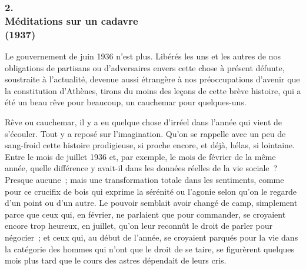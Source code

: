 \documentclass[french,twoside]{book} %
\begin{document}
\subsubsection[2. Méditations sur un cadavre, (1937)]{2. \\
Méditations sur un cadavre \\
(1937)}
\noindent \par
Le gouvernement de juin 1936 n'est plus. Libérés les uns et les autres de nos obligations de partisans ou d'adversaires envers cette chose à présent défunte, soustraite à l'actualité, devenue aussi étrangère à nos préoccupations d'avenir que la constitution d'Athènes, tirons du moins des leçons de cette brève histoire, qui a été un beau rêve pour beaucoup, un cauchemar pour quelques-uns.\par
Rêve ou cauchemar, il y a eu quelque chose d'irréel dans l'année qui vient de s'écouler. Tout y a reposé sur l'imagination. Qu'on se rappelle avec un peu de sang-froid cette histoire prodigieuse, si proche encore, et déjà, hélas, si lointaine. Entre le mois de juillet 1936 et, par exemple, le mois de février de la même année, quelle différence y avait-il dans les données réelles de la vie sociale ? Presque aucune ; mais une transformation totale dans les sentiments, comme pour ce crucifix de bois qui exprime la sérénité ou l'agonie selon qu'on le regarde d'un point ou d'un autre. Le pouvoir semblait avoir changé de camp, simplement parce que ceux qui, en février, ne parlaient que pour commander, se croyaient encore trop heureux, en juillet, qu'on leur reconnût le droit de parler pour négocier ; et ceux qui, au début de l'année, se croyaient parqués pour la vie dans la catégorie des hommes qui n'ont que le droit de se taire, se figurèrent quelques mois plus tard que le cours des astres dépendait de leurs cris.\par
\end{document}
